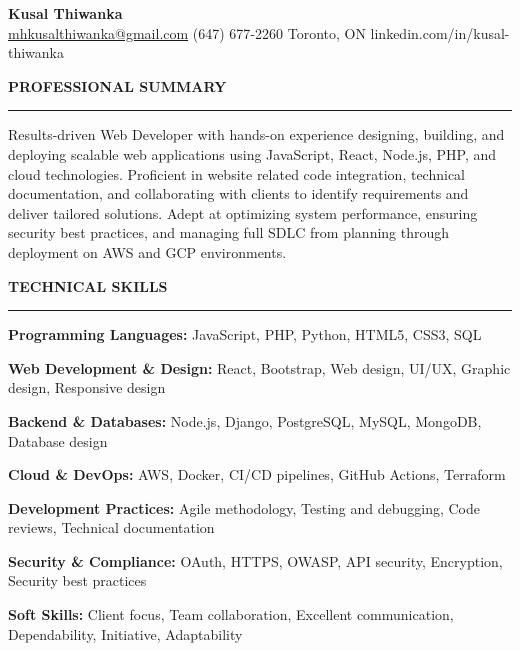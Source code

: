 \documentclass[10pt,letterpaper]{article}
\begin{document}
\begin{center}
{\LARGE\textbf{Kusal Thiwanka}}\\[3pt]
\href{mailto:mhkusalthiwanka@gmail.com}{mhkusalthiwanka@gmail.com}\hspace{2em}%
(647) 677{-}2260\hspace{2em}%
Toronto, ON\hspace{2em}
linkedin.com/in/kusal-thiwanka
\end{center}

\vspace{6pt}

\textbf{PROFESSIONAL SUMMARY}\\[-8pt]
\noindent\rule{\textwidth}{1pt}

\vspace{-2pt}

Results-driven Web Developer with hands-on experience designing, building, and deploying scalable web applications using JavaScript, React, Node.js, PHP, and cloud technologies. Proficient in website related code integration, technical documentation, and collaborating with clients to identify requirements and deliver tailored solutions. Adept at optimizing system performance, ensuring security best practices, and managing full SDLC from planning through deployment on AWS and GCP environments.

\vspace{8pt}

\textbf{TECHNICAL SKILLS}\\[-8pt]
\noindent\rule{\textwidth}{1pt}

\vspace{-2pt}

\textbf{Programming Languages:} JavaScript, PHP, Python, HTML5, CSS3, SQL

\textbf{Web Development \& Design:} React, Bootstrap, Web design, UI/UX, Graphic design, Responsive design

\textbf{Backend \& Databases:} Node.js, Django, PostgreSQL, MySQL, MongoDB, Database design

\textbf{Cloud \& DevOps:} AWS, Docker, CI/CD pipelines, GitHub Actions, Terraform

\textbf{Development Practices:} Agile methodology, Testing and debugging, Code reviews, Technical documentation

\textbf{Security \& Compliance:} OAuth, HTTPS, OWASP, API security, Encryption, Security best practices

\textbf{Soft Skills:} Client focus, Team collaboration, Excellent communication, Dependability, Initiative, Adaptability
\end{document}
